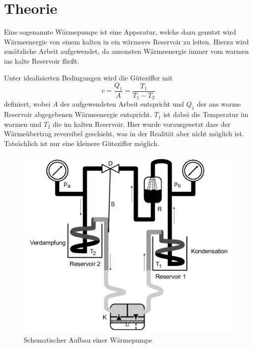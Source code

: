 \section{Theorie}
\label{sec:Theorie}




Eine sogenannte Wärmepumpe ist eine Apperatur, welche dazu genutzt wird Wärmeenergie von einem kalten in ein wärmeres Reservoir zu leiten. 
Hierzu wird zusätzliche Arbeit aufgewendet, da ansonsten Wärmeenergie immer vom warmen ins kalte Reservoir fließt.

Unter idealisierten Bedingungen wird die Güteziffer mit
\begin{equation}
    v = \frac{Q_1}{A} = \frac{T_1}{T_1-T_2}
    \label{eq:gueteziffer}
\end{equation}
definiert, wobei $A$ der aufgewendeten Arbeit entspricht und $Q_1$ der ans warme Reservoir abgegebenen Wärmeenergie entspricht. $T_1$ ist dabei die Temperatur im warmen und $T_2$ die im kalten Reservoir. \cite{V206}
Hier wurde vorausgesetzt dass der Wärmeübertrag reversibel geschieht, was in der Realität aber nicht möglich ist. Tatsächlich ist nur eine kleinere Güteziffer möglich.

\begin{figure}
    \centering
    \includegraphics[width=\textwidth/2]{images/skizze_1.png}
    \caption{Schematischer Aufbau einer Wärmepumpe\cite{V206}}
    \label{fig:skizze_1}
\end{figure}

